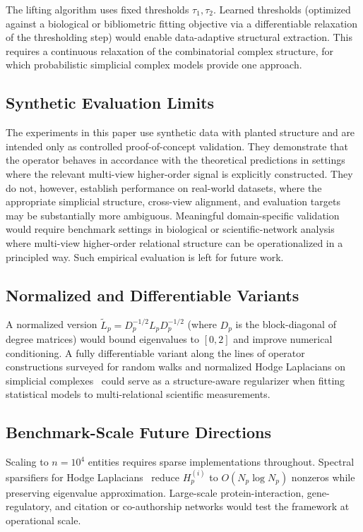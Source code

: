 \documentclass[11pt]{article}
\theoremstyle{definition}
\theoremstyle{remark}
\begin{document}
The lifting algorithm uses fixed thresholds $\tau_1,\tau_2$. Learned thresholds
(optimized against a biological or bibliometric fitting objective via a differentiable relaxation of the
thresholding step) would enable data-adaptive structural extraction. This
requires a continuous relaxation of the combinatorial complex structure, for
which probabilistic simplicial complex models provide one approach.

\subsection{Synthetic Evaluation Limits}

The experiments in this paper use synthetic data with planted structure and are intended only as controlled proof-of-concept validation. They demonstrate that the operator behaves in accordance with the theoretical predictions in settings where the relevant multi-view higher-order signal is explicitly constructed. They do not, however, establish performance on real-world datasets, where the appropriate simplicial structure, cross-view alignment, and evaluation targets may be substantially more ambiguous. Meaningful domain-specific validation would require benchmark settings in biological or scientific-network analysis where multi-view higher-order relational structure can be operationalized in a principled way. Such empirical evaluation is left for future work.

\subsection{Normalized and Differentiable Variants}

A normalized version $\tilde{L}_p = D_p^{-1/2}L_p D_p^{-1/2}$ (where $D_p$ is
the block-diagonal of degree matrices) would bound eigenvalues to $[0,2]$ and
improve numerical conditioning. A fully differentiable variant along the lines of operator constructions surveyed for random walks and normalized Hodge Laplacians on simplicial complexes~\cite{schaub2020} could serve as a structure-aware regularizer when fitting statistical models to multi-relational scientific measurements.

\subsection{Benchmark-Scale Future Directions}

Scaling to $n=10^4$ entities requires sparse implementations throughout.
Spectral sparsifiers for Hodge Laplacians~\cite{horak2013} reduce $H_p^{(i)}$
to $O(N_p\log N_p)$ nonzeros while preserving eigenvalue approximation.
Large-scale protein-interaction, gene-regulatory, and citation or co-authorship networks would test the framework at operational scale.
\end{document}
